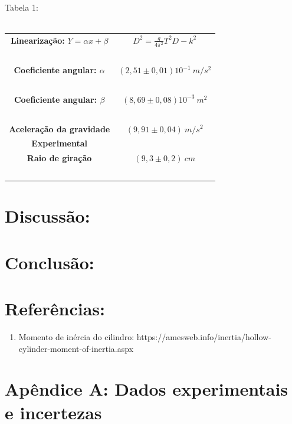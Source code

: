 \documentclass[hidelinks,a4paper,10pt]{article}
\begin{document}
\begin{center}
    Tabela 1:\\
    \ \\
\begin{tabular} {| c | c |}
    \hline
        \textbf{Linearização: }$Y = \alpha x + \beta $ & $D^2 = \frac{g}{4\pi^2}T^2D - k^2$ \\
        \ & \ \\
    \hline
        \textbf{Coeficiente angular: $\alpha$ } & $(2,51 \pm 0,01) 10^{-1} \ m/s^2$ \\
        \ & \ \\
    \hline
        \textbf{Coeficiente angular: $\beta$ } & $(8,69 \pm 0,08) 10^{-3} \ m^2$ \\
        \ & \ \\
    \hline
    \textbf{Aceleração da gravidade} & $(9,91 \pm 0,04) \ m/s^2$ \\
    \textbf{Experimental} & \ \\
    \hline
        \textbf{Raio de giração } & $(9,3 \pm 0,2)  \ cm$ \\
        \ & \ \\
    \hline        
\end{tabular}
\end{center}
\section*{Discussão:}

\section*{Conclusão:}

\section*{Referências:}
\begin{enumerate}
    \item Momento de inércia do cilindro: https://amesweb.info/inertia/hollow-cylinder-moment-of-inertia.aspx
\end{enumerate}

\section*{Apêndice A: Dados experimentais e incertezas}
\end{document}
